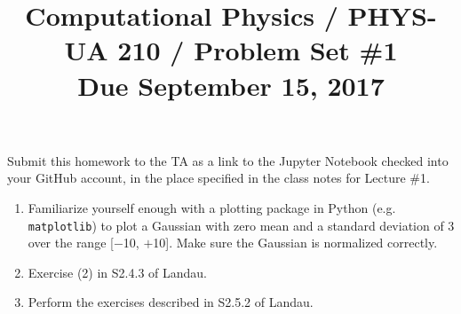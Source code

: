 \documentclass[11pt, preprint]{aastex}
\begin{document}
\title{\bf Computational Physics / PHYS-UA 210 / Problem Set \#1
\\ Due September 15, 2017 }

Submit this homework to the TA as a link to the Jupyter Notebook
checked into your GitHub account, in the place specified in the class
notes for Lecture \#1.

\begin{enumerate}

  \item Familiarize yourself enough with a plotting package in Python
    (e.g. {\tt matplotlib}) to plot a Gaussian with zero mean and a
    standard deviation of 3 over the range [$-$10, $+$10]. Make sure
    the Gaussian is normalized correctly.

  \item Exercise (2) in S2.4.3 of Landau.

  \item Perform the exercises described in S2.5.2 of Landau.

\end{enumerate}
\end{document}
